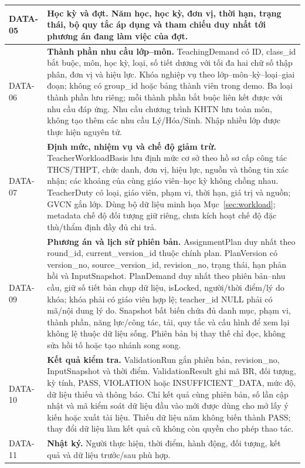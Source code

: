 \documentclass[12pt,a4paper]{report}
\begin{document}
\begin{longtable}{|p{1.45cm}|p{12.5cm}|}
DATA-05 & \textbf{Học kỳ và đợt.} Năm học, học kỳ, đơn vị, thời hạn, trạng thái, bộ quy tắc áp dụng và tham chiếu duy nhất tới phương án đang làm việc của đợt. \\\hline
DATA-06 & \textbf{Thành phần nhu cầu lớp--môn.} TeachingDemand có ID, class\_id bắt buộc, môn, học kỳ, loại, số tiết dương với tối đa hai chữ số thập phân, đơn vị và hiệu lực. Khóa nghiệp vụ theo lớp--môn--kỳ--loại--giai đoạn; không có group\_id hoặc bảng thành viên trong demo. Ba loại thành phần lưu riêng; mỗi thành phần bắt buộc liên kết được với nhu cầu đáp ứng. Nhu cầu chương trình KHTN lưu toàn môn, không tạo thêm các nhu cầu Lý/Hóa/Sinh. Nhập nhiều lớp được thực hiện nguyên tử. \\\hline
DATA-07 & \textbf{Định mức, nhiệm vụ và chế độ giảm trừ.} TeacherWorkloadBasis lưu định mức cơ sở theo hồ sơ cấp công tác THCS/THPT, chức danh, đơn vị, hiệu lực, nguồn và thông tin xác nhận; các khoảng của cùng giáo viên--học kỳ không chồng nhau. TeacherDuty có loại, giáo viên, phạm vi, thời hạn, giá trị và nguồn; GVCN gắn lớp. Dùng bộ dữ liệu minh họa Mục~\ref{sec:workload}; metadata chế độ đối tượng giữ riêng, chưa kích hoạt chế độ đặc thù/thẩm định đầy đủ chi trả. \\\hline
DATA-09 & \textbf{Phương án và lịch sử phiên bản.} AssignmentPlan duy nhất theo round\_id, current\_version\_id thuộc chính plan. PlanVersion có version\_no, source\_version\_id, revision\_no, trạng thái, hạn phản hồi và InputSnapshot. PlanDemand duy nhất theo phiên bản--nhu cầu, giữ số tiết bản chụp dữ liệu, isLocked, người/thời điểm/lý do khóa; khóa phải có giáo viên hợp lệ; teacher\_id NULL phải có mã/nội dung lý do. Snapshot bất biến chứa đủ danh mục, phạm vi, thành phần, năng lực/công tác, tải, quy tắc và cấu hình để xem lại không lệ thuộc dữ liệu sống. Phiên bản bị thay thế chỉ đọc, không sửa hồi tố hoặc tạo nhánh song song. \\\hline
DATA-10 & \textbf{Kết quả kiểm tra.} ValidationRun gắn phiên bản, revision\_no, InputSnapshot và thời điểm. ValidationResult ghi mã BR, đối tượng, kỳ tính, PASS, VIOLATION hoặc INSUFFICIENT\_DATA, mức độ, dữ liệu thiếu và thông báo. Chỉ kết quả cùng phiên bản, số lần cập nhật và mã kiểm soát dữ liệu đầu vào mới được dùng cho mở lấy ý kiến hoặc xuất tài liệu. Thiếu dữ liệu năm không biến thành PASS; thay đổi dữ liệu làm kết quả cũ không còn quyền cho phép thao tác. \\\hline
DATA-11 & \textbf{Nhật ký.} Người thực hiện, thời điểm, hành động, đối tượng, kết quả và dữ liệu trước/sau phù hợp. \\\hline

\end{longtable}
\end{document}
